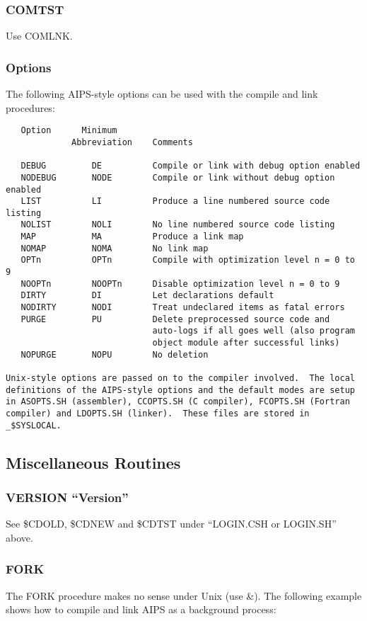 \subsubsection{COMTST}
Use COMLNK.


\subsubsection{Options}
The following AIPS-style options can be used with the compile and link
procedures:

\begin{verbatim}
   Option      Minimum
             Abbreviation    Comments

   DEBUG         DE          Compile or link with debug option enabled
   NODEBUG       NODE        Compile or link without debug option enabled
   LIST          LI          Produce a line numbered source code listing
   NOLIST        NOLI        No line numbered source code listing
   MAP           MA          Produce a link map
   NOMAP         NOMA        No link map
   OPTn          OPTn        Compile with optimization level n = 0 to 9
   NOOPTn        NOOPTn      Disable optimization level n = 0 to 9
   DIRTY         DI          Let declarations default
   NODIRTY       NODI        Treat undeclared items as fatal errors
   PURGE         PU          Delete preprocessed source code and
                             auto-logs if all goes well (also program
                             object module after successful links)
   NOPURGE       NOPU        No deletion

Unix-style options are passed on to the compiler involved.  The local
definitions of the AIPS-style options and the default modes are setup
in ASOPTS.SH (assembler), CCOPTS.SH (C compiler), FCOPTS.SH (Fortran
compiler) and LDOPTS.SH (linker).  These files are stored in _$SYSLOCAL.

\end{verbatim}
\subsection{Miscellaneous Routines}

\subsubsection{VERSION ``Version''}
See \$CDOLD, \$CDNEW and \$CDTST under ``LOGIN.CSH or LOGIN.SH'' above.


\subsubsection{FORK}
The FORK procedure makes no sense under Unix (use \&).  The following
example shows how to compile and link AIPS as a background process:

